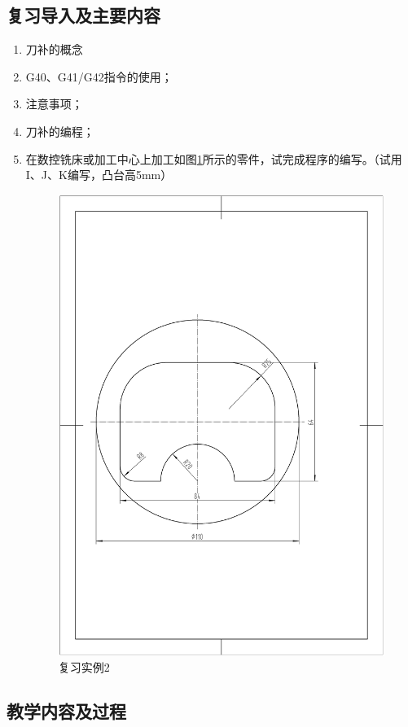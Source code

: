 \subsection{复习导入及主要内容}
\begin{enumerate}[1、]
\item 刀补的概念
\item G40、G41/G42指令的使用；
\item 注意事项；
\item 刀补的编程；
\item 在数控铣床或加工中心上加工如图\ref{fig:8-1}所示的零件，试完成程序的编写。（试用I、J、K编写，凸台高5mm）

\begin{figure}[h]
	\centering
	\includegraphics[width=0.8\linewidth,trim=40 150 70 220,clip]{data/image/7-2.jpg}
	\caption{复习实例2}
	\label{fig:8-1}
\end{figure}
\end{enumerate}


\subsection{教学内容及过程}

